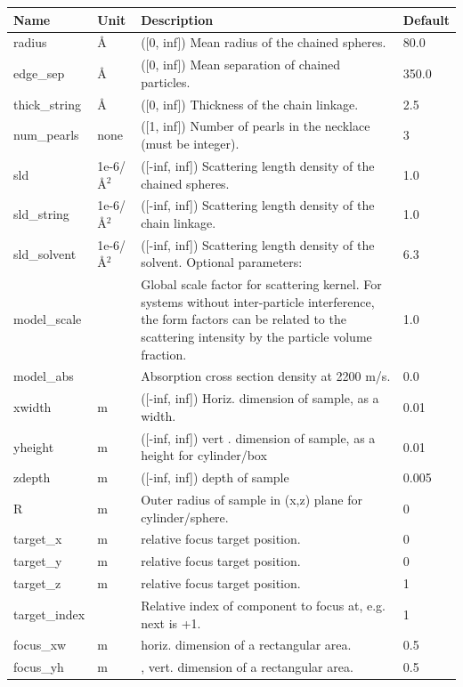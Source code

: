 \begin{longtable}{p{}p{}p{}p{}}
\toprule
\textbf{Name} & \textbf{Unit} & \textbf{Description} & \textbf{Default} \\
\midrule
\endhead
radius & \AA{} & ([0, inf]) Mean radius of the chained spheres. & 80.0 \\
edge\_sep & \AA{} & ([0, inf]) Mean separation of chained particles. & 350.0 \\
thick\_string & \AA{} & ([0, inf]) Thickness of the chain linkage. & 2.5 \\
num\_pearls & none & ([1, inf]) Number of pearls in the necklace (must be integer). & 3 \\
sld & 1e-6/\AA{}$^{2}$ & ([-inf, inf]) Scattering length density of the chained spheres. & 1.0 \\
sld\_string & 1e-6/\AA{}$^{2}$ & ([-inf, inf]) Scattering length density of the chain linkage. & 1.0 \\
sld\_solvent & 1e-6/\AA{}$^{2}$ & ([-inf, inf]) Scattering length density of the solvent. Optional parameters: & 6.3 \\
model\_scale &   & Global scale factor for scattering kernel. For systems without inter-particle interference, the form factors can be related to the scattering intensity by the particle volume fraction. & 1.0 \\
model\_abs &   & Absorption cross section density at 2200 m/s. & 0.0 \\
xwidth & m & ([-inf, inf]) Horiz. dimension of sample, as a width. & 0.01 \\
yheight & m & ([-inf, inf]) vert . dimension of sample, as a height for cylinder/box & 0.01 \\
zdepth & m & ([-inf, inf]) depth of sample & 0.005 \\
R & m & Outer radius of sample in (x,z) plane for cylinder/sphere. & 0 \\
target\_x & m & relative focus target position. & 0 \\
target\_y & m & relative focus target position. & 0 \\
target\_z & m & relative focus target position. & 1 \\
target\_index &   & Relative index of component to focus at, e.g. next is +1. & 1 \\
focus\_xw & m & horiz. dimension of a rectangular area. & 0.5 \\
focus\_yh & m & , vert. dimension of a rectangular area. & 0.5 \\

\end{longtable}
